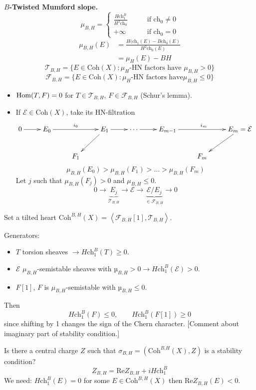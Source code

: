 \medskip\noindent
{\bf $B$-Twisted Mumford slope.}
$$
\mu_{B,H}=
\begin{cases}
\frac{H \text{ch}_1^B}{H^2 \text{ch}_0}\qquad &\text{if }\text{ch}_0\neq 0 \\
+\infty\qquad &\text{if }\text{ch}_0=0
\end{cases}
$$
\begin{align*}
\mu_{B,H}(E)&=\frac{H(\text{ch}_1(E)-B\text{ch}_0(E)}{H^2\text{ch}_0(E)}\\
&=\mu_H(E)-BH
\end{align*}
$$
\mathcal{T}_{B,H}=\{E \in \text{Coh}(X):\mu_H\text{-HN factors have }
\mu_{B,H}>0\}
$$
$$
\mathcal{F}_{B,H}=\{E \in \text{Coh}(X): \mu_H\text{-HN factors have
}\mu_{B,H}\leq 0\}
$$
\begin{itemize}
\item $\mathop{\mathrm{Hom}}\nolimits(T,F)=0$ for $T \in \mathcal{T}_{B,H}$, $F \in \mathcal{F}_{B,H}$ 
(Schur's lemma).
\item If $\mathcal{E}\in\text{Coh}(X)$, take its HN-filtration
$$
\xymatrix{
0\ar[r]&E_0\ar[rr]^{i_0}&&E_1\ar[dl]\ar[r]&\cdots\ar[r]
&E_{m-1}\ar[rr]^{i_m}&&E_m=\mathcal{E}\ar[dl]\\
&&F_1& & & & F_m
}
$$
$$
\mu_{B,H}(E_0)>\mu_{B,H}(F_1)>\ldots>\mu_{B,H}(F_m)
$$
Let $j$ such that $\mu_{B,H}(F_j)>0$ and $\mu_{B,H}\leq 0$.
$$
0 \to \underbrace{E_j}_{\mathcal{T}_{B,H}}\to \mathcal{E} 
\to \underbrace{\mathcal{E}/E_j}_{\in \mathcal{F}_{B,H}}\to 0
$$
\end{itemize}

Set a tilted heart $\text{Coh}^{B,H}(X)=\left<\mathcal{F}_{B,H}[1],
\mathcal{T}_{B,H}\right>$.

Generators:
\begin{itemize}
\item $T$ torsion sheaves $\to H\text{ch}_1^B(T)\geq 0$.
\item $\mathcal{E}$ $\mu_{B,H}$-semistable sheaves with $µ_{B,H}>0 \to 
H\text{ch}_1^B (\mathcal{E})>0$.
\item $F[1]$,  $F$ is $\mu_{B,H}$-semistable with $µ_{B,H}\leq 0$.
\end{itemize}
Then
$$
H\text{ch}_1^B (F)\leq 0,\qquad H\text{ch}_1^B (F[1])\geq 0
$$
since shifting by 1 changes the sign of the Chern character. [Comment about
imaginary part of stability condition.]

Is there a central charge $Z$ such that $\sigma_{B,H}=(\text{Coh}^{B.H}(X),Z)$
is a stability condition?
$$
Z_{B,H}=\text{Re}Z_{B,H}+i H\text{ch}_1^B
$$
We need: $H\text{ch}_1^B(E)=0$ for some $E \in \text{Coh}^{B,H}(X)$ then
$\text{Re}Z_{B,H}(E)<0$.

